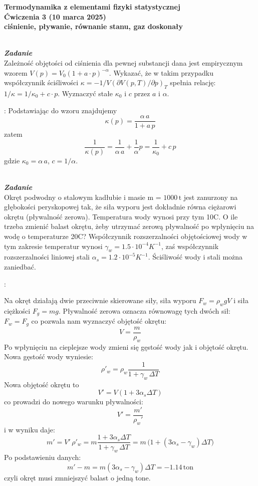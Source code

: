 \documentclass[11pt,a4paper]{article}
\newcounter{zadanie}\newcommand{\zadanie}[1][]{\addtocounter{zadanie}{1} ~\\  {\bf \emph{Zadanie \arabic{zadanie} #1 }} \\}
\begin{document}
\vspace*{-1.8cm}

\begin{centering}
\bf{\Large{Termodynamika z elementami fizyki statystycznej}}\\
Ćwiczenia 3 (10 marca 2025)\\[1mm]
ciśnienie, pływanie, równanie stanu, gaz doskonały \\
\end{centering}

\zadanie
Zależność objętości od ciśnienia dla pewnej substancji dana jest empirycznym wzorem $V(p) = V_0(1 + a\cdot p)^{-\alpha}$.
Wykazać, że w takim przypadku współczynnik ściśliwości $\kappa=-1/V(\partial V(p,T)/\partial p)_T$ spełnia relację: $1/\kappa=1/\kappa_0+c\cdot p$.
Wyznaczyć stałe $\kappa_0$ i $c$ przez $a$ i $\alpha$.

\vspace{2mm}{\bf Rozwiązanie}: Podstawiając do wzoru znajdujemy
\[
\kappa(p)=\frac{\alpha\,a}{1+a\,p}
\]
zatem
\[
\frac{1}{\kappa(p)}=\frac{1}{\alpha\,a}+\frac{1}{\alpha}p=\frac{1}{\kappa_0}+c\,p
\]
gdzie $\kappa_0=\alpha\,a$, $c=1/\alpha$.

\clearpage

\zadanie
Okręt podwodny o stalowym kadłubie i masie m = $1000 \, \textrm{t}$ jest zanurzony na głębokości peryskopowej tak, że siła wyporu jest dokładnie równa ciężarowi okrętu (pływalność zerowa). Temperatura wody wynosi przy tym 10\degree C. O ile trzeba zmienić balast okrętu, żeby utrzymać zerową pływalność po wpłynięciu na wodę o temperaturze 20\degree C? Współczynnik rozszerzalności objętościowej wody w tym zakresie temperatur wynosi $\gamma_w = 1.5 \cdot 10^{-4} K^{-1}$, zaś współczynnik rozszerzalności liniowej stali $\alpha_s = 1.2 \cdot 10^{-5} K^{-1}$. Ściśliwość wody i stali można zaniedbać.

\vspace{2mm}{\bf Rozwiązanie}:

Na okręt działają dwie przeciwnie skierowane siły, siła wyporu $F_w = \rho_w g V$ i siła ciężkości $F_g = mg$. Pływalność zerowa oznacza równowagę tych dwóch sił: $F_w = F_g$ co pozwala nam wyznaczyć objętość okrętu:
\[
V = \frac{m}{\rho_w}
\]
Po wpłynięciu na cieplejsze wody zmieni się gęstość wody jak i objętość okrętu. Nowa gęstość wody wyniesie:
\[
\rho'_w = \rho_w \frac{1}{1+\gamma_w\,\Delta T}
\]
Nowa objętość okrętu to
\[
V' = V (1+3\alpha_s \Delta T)
\]
co prowadzi do nowego warunku pływalności:
\[
V' = \frac{m'}{\rho_w'}
\]
i w wyniku daje:
\[
m' = V'\,\rho'_w = m \frac{1+3\alpha_s \Delta T}{1+\gamma_w\,\Delta T} = m\,\big(1+(3\alpha_s-\gamma_w) \Delta T\big)
\]
Po podstawieniu danych:
\[
m'-m=m (3\alpha_s-\gamma_w) \Delta T = -1.14\,\textrm{ton}
\]
czyli okręt musi zmniejszyć balast o jedną tone.
\end{document}
